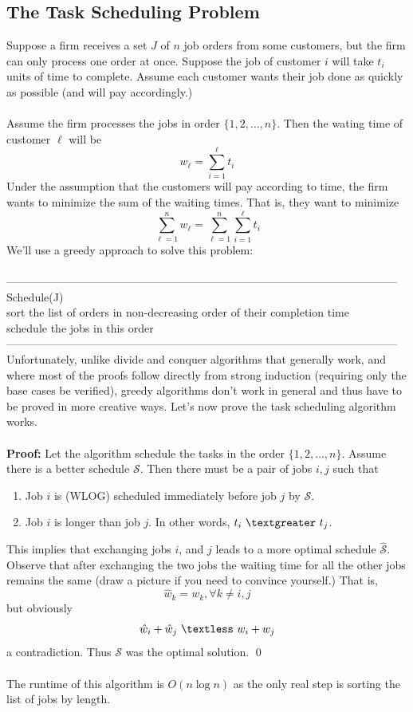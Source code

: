 \documentclass{article}
\newcommand{\lt}{\textless}
\newcommand{\gt}{\textgreater}
\newcommand{\proo}{\textbf{Proof: }}
\newcommand{\mcal}[1]{\mathcal{#1}}
\begin{document}
\subsection{The Task Scheduling Problem}
Suppose a firm receives a set $J$ of $n$ job orders from some customers, but the firm can only process one order at once. Suppose the job of customer $i$ will take $t_i$ units of time to complete. Assume each customer wants their job done as quickly as possible (and will pay accordingly.)\\\\
Assume the firm processes the jobs in order $\{1, 2, \dots, n\}$. Then the wating time of customer $\ell$ will be
\[w_{\ell} = \sum_{i = 1}^{\ell} t_i\]
Under the assumption that the customers will pay according to time, the firm wants to minimize the sum of the waiting times. That is, they want to minimize
\[\sum_{\ell = 1}^{n}w_{\ell} = \sum_{\ell = 1}^{n}\sum_{i = 1}^{\ell}t_i\]
We'll use a greedy approach to solve this problem:\\\\
---------------------------------------------------------------------------------------------------------
Schedule(J)\\
	\hspace*{7mm} sort the list of orders in non-decreasing order of their completion time\\
	\hspace*{7mm} schedule the jobs in this order\\
---------------------------------------------------------------------------------------------------------\\
Unfortunately, unlike divide and conquer algorithms that generally work, and where most of the proofs follow directly from strong induction (requiring only the base cases be verified), greedy algorithms don't work in general and thus have to be proved in more creative ways. Let's now prove the task scheduling algorithm works.\\\\
\proo Let the algorithm schedule the tasks in the order $\{1, 2, \dots, n\}$. Assume there is a better schedule $\mcal{S}$. Then there must be a pair of jobs $i, j$ such that
\begin{enumerate}
	\item Job $i$ is (WLOG) scheduled immediately before job $j$ by $\mcal{S}$.
	\item Job $i$ is longer than job $j$. In other words, $t_i\ \gt\ t_j$.
\end{enumerate}
This implies that exchanging jobs $i$, and $j$ leads to a more optimal schedule $\hat{\mcal{S}}$. Observe that after exchanging the two jobs the waiting time for all the other jobs remains the same (draw a picture if you need to convince yourself.) That is,
\[\hat{w}_k = w_k, \forall k \neq i, j\]
but obviously
\[\hat{w}_i + \hat{w}_j\ \lt\ w_i + w_j\]
a contradiction. Thus $\mcal{S}$ was the optimal solution.
\qed\\\\
The runtime of this algorithm is $O(n \log n)$ as the only real step is sorting the list of jobs by length.
\end{document}
